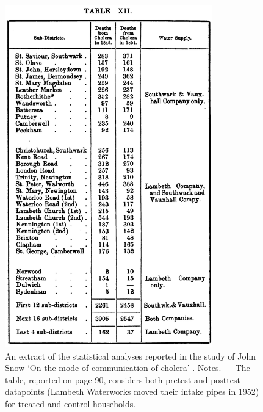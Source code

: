 \documentclass[11pt]{article}
\begin{document}
\begin{refsection}
\begin{figure}
\begin{small}
\begin{center}
\includegraphics[width=0.8\textwidth]{exhibits/snow_natural_experiment.png}
    \end{center}
    \caption{An extract of the statistical analyses reported in the study of
    John Snow `On the mode of communication of cholera' \autocite*{snow_1855}.
    Notes. --- The table, reported on page 90, considers both pretest and posttest
    datapoints (Lambeth Waterworks moved their intake pipes in 1952) for 
    treated and control households.}
    \label{fig:snow_natural_experiment}
  \end{small}
\end{figure}


\end{refsection}
\end{document}
